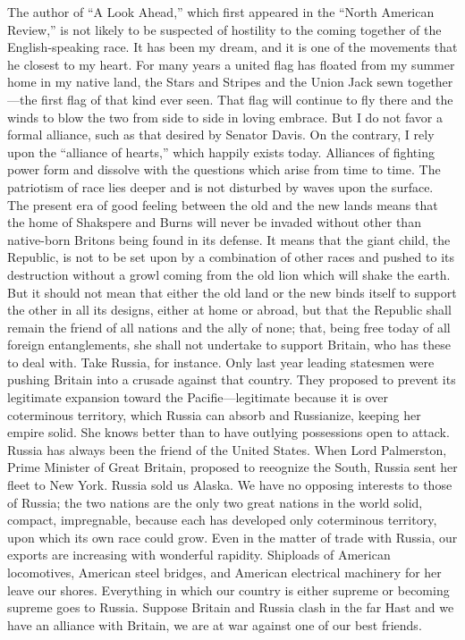 \documentclass[11pt,openany]{book}
\begin{document}
The author of ``A Look Ahead,'' which first appeared in the ``North American Review,'' is not likely to be suspected of hostility to the coming together of the English-speaking race. It has been my dream, and it is one of the movements that he closest to my heart. For many years a united flag has floated from my summer home in my native land, the Stars and Stripes and the Union Jack sewn together---the first flag of that kind ever seen. That flag will continue to fly there and the winds to blow the two from side to side in loving embrace. But I do not favor a formal alliance, such as that desired by Senator Davis. On the contrary, I rely upon the ``alliance of hearts,'' which happily exists today. Alliances of fighting power form and dissolve with the questions which arise from time to time. The patriotism of race lies deeper and is not disturbed by waves upon the surface. The present era of good feeling between the old and the new lands means that the home of Shakspere and Burns will never be invaded without other than native-born Britons being found in its defense. It means that the giant child, the Republic, is not to be set upon by a combination of other races and pushed to its destruction without a growl coming from the old lion which will shake the earth. But it should not mean that either the old land or the new binds itself to support the other in all its designs, either at home or abroad, but that the Republic shall remain the friend of all nations and the ally of none; that, being free today of all foreign entanglements, she shall not undertake to support Britain, who has these to deal with. Take Russia, for instance. Only last year leading statesmen were pushing Britain into a crusade against that country. They proposed to prevent its legitimate expansion toward the Pacifie---legitimate because it is over coterminous territory, which Russia can absorb and Russianize, keeping her empire solid. She knows better than to have outlying possessions open to attack. Russia has always been the friend of the United States. When Lord Palmerston, Prime Minister of Great Britain, proposed to reeognize the South, Russia sent her fleet to New York. Russia sold us Alaska. We have no opposing interests to those of Russia; the two nations are the only two great nations in the world solid, compact, impregnable, because each has developed only coterminous territory, upon which its own race could grow. Even in the matter of trade with Russia, our exports are increasing with wonderful rapidity. Shiploads of American locomotives, American steel bridges, and American electrical machinery for her leave our shores. Everything in which our country is either supreme or becoming supreme goes to Russia. Suppose Britain and Russia clash in the far Hast and we have an alliance with Britain, we are at war against one of our best friends.
\end{document}

